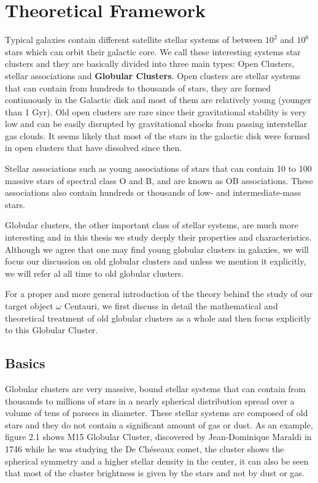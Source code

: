 \chapter{Theoretical Framework}

Typical galaxies contain different satellite stellar systems of between $ 10^{2} $ and $ 10^{6} $ stars which can orbit their galactic core. We call these interesting systems star clusters and they are basically divided into three main types: Open Clusters, stellar associations and \textbf{Globular Clusters}. Open clusters are stellar systems that can contain from hundreds to thousands of stars, they are formed continuously in the Galactic disk and most of them are relatively young (younger than 1 Gyr). Old open clusters are rare since their gravitational stability is very low and can be easily disrupted by gravitational shocks from passing interstellar gas clouds. It seems likely that most of the stars in the galactic disk were formed in open clusters that have dissolved since then. 

Stellar associations such as young associations of stars that can contain 10 to 100 massive stars of spectral class O and B, and are known as OB associations. These associations also contain hundreds or thousands of low- and intermediate-mass stars.

Globular clusters, the other important class of stellar systems, are much more interesting and in this thesis we study deeply their properties and characteristics. Although we agree that one may find young globular clusters in galaxies, we will focus our discussion on old globular clusters and unless we mention it explicitly, we will refer al all time to old globular clusters. 

For a proper and more general introduction of the theory behind the study of our target object $\omega$ Centauri, we first discuss in detail the mathematical and theoretical treatment of old globular clusters as a whole and then focus explicitly to this Globular Cluster. 

\section{Basics}
 
Globular clusters are very massive, bound stellar systems that can contain from thousands to millions of stars in a nearly spherical distribution spread over a volume of tens of parsecs in diameter. These stellar systems are composed of old stars and they do not contain a significant amount of gas or dust. As an example, figure 2.1 shows M15 Globular Cluster, discovered by Jean-Dominique Maraldi in 1746 while he was studying the De Chéseaux comet, the cluster shows the spherical symmetry and a higher stellar density in the center, it can also be seen that most of the cluster brightness is given by the stars and not by dust or gas.

